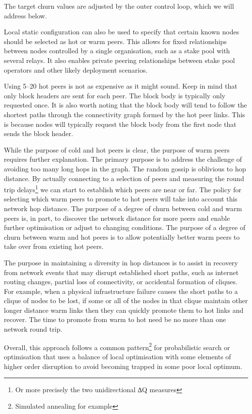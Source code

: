 \documentclass[11pt,a4paper]{article}
\begin{document}
The target churn values are adjusted by the outer control loop, which we
will address below.

Local static configuration can also be used to specify that certain
known nodes should be selected as hot or warm peers. This allows for
fixed relationships between nodes controlled by a single organisation,
such as a stake pool with several relays. It also enables private
peering relationships between stake pool operators and other likely
deployment scenarios.

Using 5--20 hot peers is not as expensive as it might sound. Keep in
mind that only block headers are sent for each peer. The block body is
typically only requested once. It is also worth noting that the block
body will tend to follow the shortest paths through the connectivity
graph formed by the hot peer links. This is because nodes will typically
request the block body from the first node that sends the block header.

While the purpose of cold and hot peers is clear, the purpose of warm
peers requires further explanation. The primary purpose is to address
the challenge of avoiding too many long hops in the graph. The random
gossip is oblivious to hop distance. By actually connecting to a
selection of peers and measuring the round trip delays\footnote{Or more
  precisely the two unidirectional ∆Q measures} we can start to
establish which peers are near or far. The policy for selecting which
warm peers to promote to hot peers will take into account this network
hop distance. The purpose of a degree of churn between cold and warm
peers is, in part, to discover the network distance for more peers and
enable further optimisation or adjust to changing conditions. The
purpose of a degree of churn between warm and hot peers is to allow
potentially better warm peers to take over from existing hot peers.

The purpose in maintaining a diversity in hop distances is to assist in
recovery from network events that may disrupt established short paths,
such as internet routing changes, partial loss of connectivity, or
accidental formation of cliques. For example, when a physical
infrastructure failure causes the short paths to a clique of nodes to be
lost, if some or all of the nodes in that clique maintain other longer
distance warm links then they can quickly promote them to hot links and
recover. The time to promote from warm to hot need be no more than one
network round trip.

Overall, this approach follows a common pattern\footnote{Simulated
  annealing for example} for probabilistic search or optimisation that
uses a balance of local optimisation with some elements of higher order
disruption to avoid becoming trapped in some poor local optimum.
\end{document}
